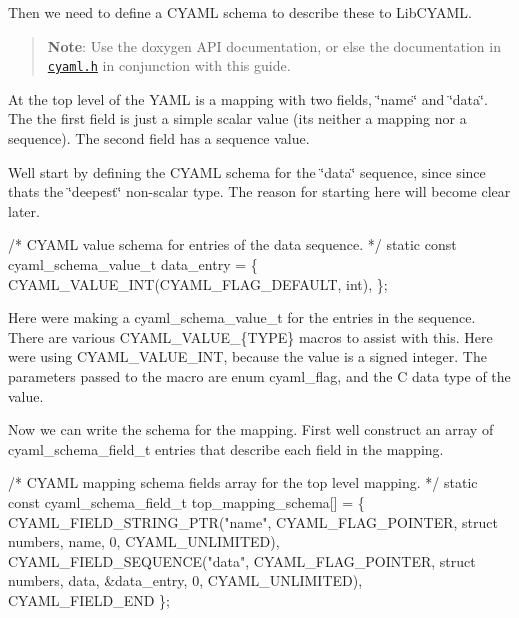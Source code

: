 Then we need to define a C\+Y\+A\+ML schema to describe these to Lib\+C\+Y\+A\+ML.

\begin{quote}
{\bfseries Note}\+: Use the doxygen A\+PI documentation, or else the documentation in \href{https://github.com/tlsa/libcyaml/blob/master/include/cyaml/cyaml.h}{\tt cyaml.\+h} in conjunction with this guide. \end{quote}


At the top level of the Y\+A\+ML is a mapping with two fields, \char`\"{}name\char`\"{} and \char`\"{}data\char`\"{}. The the first field is just a simple scalar value (it\textquotesingle{}s neither a mapping nor a sequence). The second field has a sequence value.

We\textquotesingle{}ll start by defining the C\+Y\+A\+ML schema for the \char`\"{}data\char`\"{} sequence, since since that\textquotesingle{}s the \char`\"{}deepest\char`\"{} non-\/scalar type. The reason for starting here will become clear later.


\begin{DoxyCode}
\textcolor{comment}{/* CYAML value schema for entries of the data sequence. */}
\textcolor{keyword}{static} \textcolor{keyword}{const} cyaml\_schema\_value\_t data\_entry = \{
    CYAML\_VALUE\_INT(CYAML\_FLAG\_DEFAULT, \textcolor{keywordtype}{int}),
\};
\end{DoxyCode}


Here we\textquotesingle{}re making a {\ttfamily cyaml\+\_\+schema\+\_\+value\+\_\+t} for the entries in the sequence. There are various {\ttfamily C\+Y\+A\+M\+L\+\_\+\+V\+A\+L\+U\+E\+\_\+\{T\+Y\+PE\}} macros to assist with this. Here we\textquotesingle{}re using {\ttfamily C\+Y\+A\+M\+L\+\_\+\+V\+A\+L\+U\+E\+\_\+\+I\+NT}, because the value is a signed integer. The parameters passed to the macro are {\ttfamily enum cyaml\+\_\+flag}, and the C data type of the value.

Now we can write the schema for the mapping. First we\textquotesingle{}ll construct an array of {\ttfamily cyaml\+\_\+schema\+\_\+field\+\_\+t} entries that describe each field in the mapping.


\begin{DoxyCode}
\textcolor{comment}{/* CYAML mapping schema fields array for the top level mapping. */}
\textcolor{keyword}{static} \textcolor{keyword}{const} cyaml\_schema\_field\_t top\_mapping\_schema[] = \{
    CYAML\_FIELD\_STRING\_PTR(\textcolor{stringliteral}{"name"}, CYAML\_FLAG\_POINTER,
            \textcolor{keyword}{struct} numbers, name,
            0, CYAML\_UNLIMITED),
    CYAML\_FIELD\_SEQUENCE(\textcolor{stringliteral}{"data"}, CYAML\_FLAG\_POINTER,
            \textcolor{keyword}{struct} numbers, data, &data\_entry,
            0, CYAML\_UNLIMITED),
    CYAML\_FIELD\_END
\};
\end{DoxyCode}


